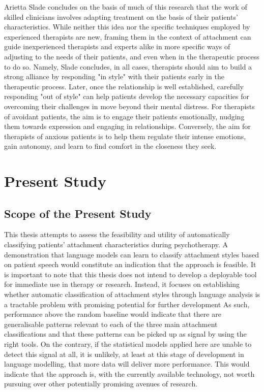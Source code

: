 \documentclass[12pt]{report}
\begin{document}
Arietta Slade \citeyear{Slade2016} concludes on the basis of much of this research that the work of skilled clinicians involves adapting treatment on the basis of their patients' characteristics. While neither this idea nor the specific techniques employed by experienced therapists are new, framing them in the context of attachment can guide inexperienced therapists and experts alike in more specific ways of adjusting to the needs of their patients, and even when in the therapeutic process to do so.
Namely, Slade concludes, in all cases, therapists should aim to build a strong alliance by responding "in style" with their patients early in the therapeutic process.
Later, once the relationship is well established, carefully responding "out of style" can help patients develop the necessary capacities for overcoming their challenges in move beyond their mental distress.
For therapists of avoidant patients, the aim is to engage their patients emotionally, nudging them towards expression and engaging in relationships.
Conversely, the aim for therapists of anxious patients is to help them regulate their intense emotions, gain autonomy, and learn to find comfort in the closeness they seek.

\chapter{Present Study}
\section{Scope of the Present Study}
This thesis attempts to assess the feasibility and utility of automatically classifying patients' attachment characteristics during psychotherapy.
A demonstration that language models can learn to classify attachment styles based on patient speech would constitute an indication that the approach is feasible.
It is important to note that this thesis does not intend to develop a deployable tool for immediate use in therapy or research.
Instead, it focuses on establishing whether automatic classification of attachment styles through language analysis is a tractable problem with promising potential for further development
As such, performance above the random baseline would indicate that there are generalisable patterns relevant to each of the three main attachment classifications and that these patterns can be picked up as signal by using the right tools.
On the contrary, if the statistical models applied here are unable to detect this signal at all, it is unlikely, at least at this stage of development in language modelling, that more data will deliver more performance.
This would indicate that the approach is, with the currently available technology, not worth pursuing over other potentially promising avenues of research.
\end{document}
